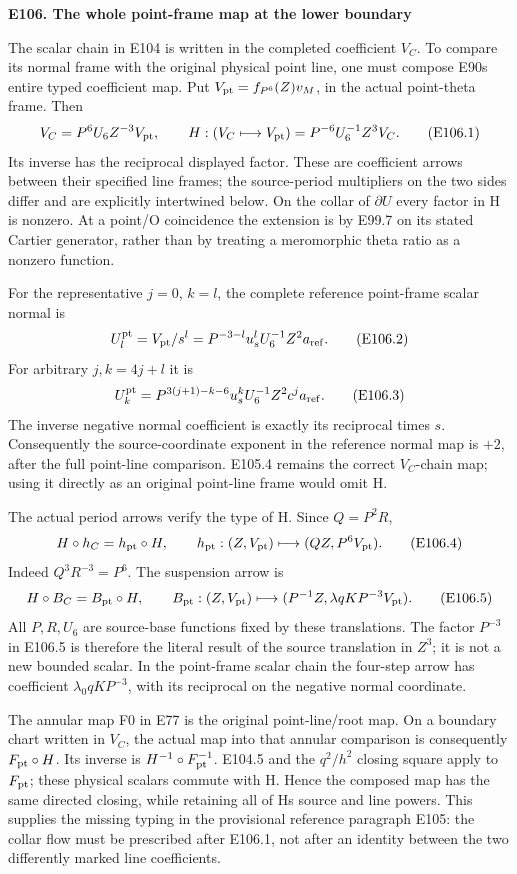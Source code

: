 \medskip\noindent\textbf{E106. The whole point-frame map at the lower boundary}

\par\nobreak

The scalar chain in E104 is written in the completed coefficient \(V_C\). To compare its normal frame with the original physical point line, one must compose E90\textquotesingle s entire typed coefficient map. Put \(V_{\rm pt}=f_{P^6}(Z)v_M\), in the actual point-theta frame. Then
\[
 V_C=P^6U_6Z^{-3}V_{\rm pt},\qquad
 H:(V_C\longmapsto V_{\rm pt})=P^{-6}U_6^{-1}Z^3V_C.
 \tag{E106.1}
\]
Its inverse has the reciprocal displayed factor. These are coefficient arrows between their specified line frames; the source-period multipliers on the two sides differ and are explicitly intertwined below. On the collar of \(\partial U\) every factor in H is nonzero. At a point/O coincidence the extension is by E99.7 on its stated Cartier generator, rather than by treating a meromorphic theta ratio as a nonzero function.

For the representative \(j=0\), \(k=l\), the complete reference point-frame scalar normal is
\[
 U_l^{\rm pt}=V_{\rm pt}/s^l
   =P^{-3-l}u_s^l U_6^{-1}Z^2a_{\rm ref}.
 \tag{E106.2}
\]
For arbitrary \(j,k=4j+l\) it is
\[
 U_k^{\rm pt}
  =P^{3(j+1)-k-6}u_s^kU_6^{-1}Z^2c^j a_{\rm ref}.
 \tag{E106.3}
\]
The inverse negative normal coefficient is exactly its reciprocal times \(s\). Consequently the source-coordinate exponent in the reference normal map is \(+2\), after the full point-line comparison. E105.4 remains the correct \(V_C\)-chain map; using it directly as an original point-line frame would omit H.

The actual period arrows verify the type of H. Since \(Q=P^2R\),
\[
 H\circ h_C=h_{\rm pt}\circ H,
 \qquad h_{\rm pt}:(Z,V_{\rm pt})\longmapsto(QZ,P^6V_{\rm pt}).
 \tag{E106.4}
\]
Indeed \(Q^3R^{-3}=P^6\). The suspension arrow is
\[
 H\circ B_C=B_{\rm pt}\circ H,
 \qquad B_{\rm pt}:(Z,V_{\rm pt})\longmapsto
       (P^{-1}Z,\lambda qK P^{-3}V_{\rm pt}).
 \tag{E106.5}
\]
All \(P,R,U_6\) are source-base functions fixed by these translations. The factor \(P^{-3}\) in E106.5 is therefore the literal result of the source translation in \(Z^3\); it is not a new bounded scalar. In the point-frame scalar chain the four-step arrow has coefficient \(\lambda_0qK P^{-3}\), with its reciprocal on the negative normal coordinate.

The annular map F0 in E77 is the original point-line/root map. On a boundary chart written in \(V_C\), the actual map into that annular comparison is consequently \(F_{\rm pt}\circ H\). Its inverse is \(H^{-1}\circ F_{\rm pt}^{-1}\). E104.5 and the \(q^2/h^2\) closing square apply to \(F_{\rm pt}\); these physical scalars commute with H. Hence the composed map has the same directed closing, while retaining all of H\textquotesingle s source and line powers. This supplies the missing typing in the provisional reference paragraph E105: the collar flow must be prescribed after E106.1, not after an identity between the two differently marked line coefficients.

